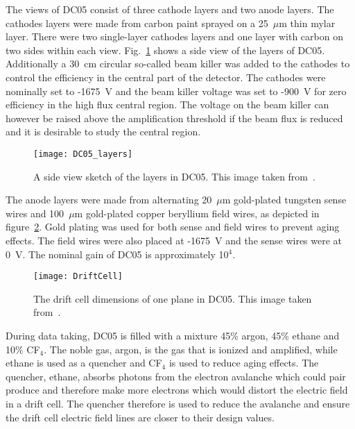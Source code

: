 The views of DC05 consist of three cathode layers and two anode layers.  The
cathodes layers were made from carbon paint sprayed on a 25~$\mu$m thin mylar
layer.  There were two single-layer cathodes layers and one layer with carbon on
two sides within each view.  Fig.~\ref{fig::DC05_layers} shows a side view of
the layers of DC05.  Additionally a 30~cm circular so-called beam killer was
added to the cathodes to control the efficiency in the central part of the
detector.  The cathodes were nominally set to -1675~V and the beam killer
voltage was set to -900~V for zero efficiency in the high flux central region.
The voltage on the beam killer can however be raised above the amplification
threshold if the beam flux is reduced and it is desirable to study the central
region.

\begin{figure}[h!t]
  \centering \texttt{[image: DC05\_layers]}
  \caption{A side view sketch of the layers in DC05.  This image taken
    from~\cite{heitzDC05DNP}.}
  \label{fig::DC05_layers}
\end{figure}

The anode layers were made from alternating 20~$\mu$m gold-plated tungsten sense
wires and 100~$\mu$m gold-plated copper beryllium field wires, as depicted in
figure~\ref{fig:driftcell}.  Gold plating was used for both sense and field
wires to prevent aging effects.  The field wires were also placed at -1675~V and
the sense wires were at 0~V.  The nominal gain of DC05 is approximately 10$^4$.

\begin{figure}
  \centering \texttt{[image: DriftCell]}
  \caption{}{The drift cell dimensions of one plane in DC05.  This image taken
    from~\cite{heitzDC05DNP}.}
  \label{fig:driftcell}%
\end{figure}

During data taking, DC05 is filled with a mixture 45\% argon, 45\% ethane and
10\% CF$_4$.  The noble gas, argon, is the gas that is ionized and amplified,
while ethane is used as a quencher and CF$_4$ is used to reduce aging effects.
The quencher, ethane, absorbs photons from the electron avalanche which could
pair produce and therefore make more electrons which would distort the electric
field in a drift cell.  The quencher therefore is used to reduce the avalanche
and ensure the drift cell electric field lines are closer to their design
values.


